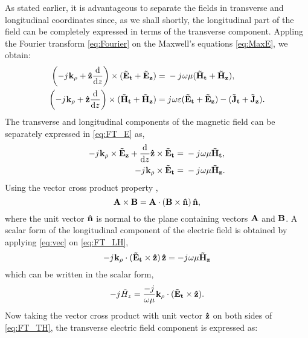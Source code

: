 \documentclass[12pt]{article}
\begin{document}
As stated earlier, it is advantageous to separate the fields in transverse and longitudinal coordinates since, as we shall shortly, the longitudinal part of the field can be completely expressed in terms of the transverse component. Appling the Fourier transform \eqref{eq:Fourier} on the Maxwell's equations \eqref{eq:MaxE}, we obtain:
%
\begin{subequations}
  \begin{align}
    \left(-j\mkern1mu \mathbf{k_{\rho}} + \mathbf{\hat{z}} \dv{}{z} \right)\times (\mathbf{\tilde{E}_t} + \mathbf{\tilde{E}_z})  ={}& -j\mkern1mu \omega \mu (\mathbf{\tilde{H}_t} + \mathbf{\tilde{H}_z}),
    \label{eq:FT_E}\\
    \left(-j\mkern1mu \mathbf{k_{\rho}} + \mathbf{\hat{z}} \dv{}{z} \right)\times (\mathbf{\tilde{H}_t} + \mathbf{\tilde{H}_z})  ={}& j\mkern1mu \omega \varepsilon (\mathbf{\tilde{E}_t} + \mathbf{\tilde{E}_z}) -
    (\mathbf{\tilde{J}_t} + \mathbf{\tilde{J}_z}).
    \label{eq:FT_H}
  \end{align}
  \label{eq:FT_EH}%
\end{subequations}
%
The transverse and longitudinal components of the magnetic field can be separately expressed in \eqref{eq:FT_E} as,
%
\begin{subequations}
  \begin{align}
    -j\mkern1mu \mathbf{k_{\rho}} \times \mathbf{\tilde{E}_z} +
    \dv{}{z}\mathbf{\hat{z}} \times \mathbf{\tilde{E}_t} ={}&
    -j\mkern1mu \omega \mu \mathbf{\tilde{H}_t},
    \label{eq:FT_TH}\\
    -j\mkern1mu \mathbf{k_{\rho}} \times \mathbf{\tilde{E}_t} ={}&
    -j\mkern1mu \omega \mu \mathbf{\tilde{H}_z}.
    \label{eq:FT_LH}
  \end{align}
  \label{eq:FT_TLH}%
\end{subequations}
%
Using the vector cross product property \cite[p. 117]{fang2010},
%
\begin{equation}
  \mathbf{A} \times \mathbf{B} =\mathbf{A} \cdot (\mathbf{B} \times \mathbf{\hat{n}}) \, \mathbf{\hat{n}},
  \label{eq:vec}
\end{equation}
%
where the unit vector $\mathbf{\hat{n}}$ is normal to the plane containing vectors $\mathbf{A}$ and $\mathbf{B}$. A scalar form of the longitudinal component of the electric field is obtained by applying \eqref{eq:vec} on \eqref{eq:FT_LH},
%
\begin{equation}
   - j\mkern1mu \mathbf{k_{\rho}} \cdot (\mathbf{\tilde{E}_t} \times \mathbf{\hat{z}}) \, \mathbf{\hat{z}} =
   - j\mkern1mu \omega \mu \mathbf{\tilde{H}_z}
  \label{eq:FT_sLE}
\end{equation}
%
which can be written in the scalar form,
%
\begin{equation}
   - j\mkern1mu \tilde{H}_z = \frac{- j\mkern1mu}{\omega \mu}
   \mathbf{k_{\rho}} \cdot (\mathbf{\tilde{E}_t} \times \mathbf{\hat{z}}).
  \label{eq:sLH}
\end{equation}
%
Now taking the vector cross product with unit vector $\mathbf{\hat{z}}$ on both sides of \eqref{eq:FT_TH}, the transverse electric field component is expressed as:
\end{document}
